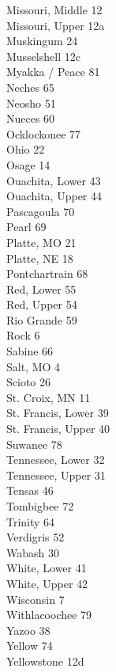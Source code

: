 \documentclass[11pt]{article}
\begin{document}
\begin{multicols}{3}
Missouri, Middle 12\\
Missouri, Upper 12a\\
Muskingum 24\\
Musselshell 12c\\
Myakka / Peace 81\\
Neches 65\\
Neosho 51\\
Nueces 60\\
Ocklockonee 77\\
Ohio 22\\
Osage 14\\
Ouachita, Lower 43\\
Ouachita, Upper 44\\
Pascagoula 70\\
Pearl 69\\
Platte, MO 21\\
Platte, NE 18\\
Pontchartrain 68\\
Red, Lower 55\\
Red, Upper 54\\
Rio Grande 59\\
Rock 6\\
Sabine 66\\
Salt, MO 4\\
Scioto 26\\
St. Croix, MN 11\\
St. Francis, Lower 39\\
St. Francis, Upper 40\\
Suwanee 78\\
Tennessee, Lower 32\\
Tennessee, Upper 31\\
Tensas 46\\
Tombigbee 72\\
Trinity 64\\
Verdigris 52\\
Wabash 30\\
White, Lower 41\\
White, Upper 42\\
Wisconsin 7\\
Withlacoochee 79\\
Yazoo 38\\
Yellow 74\\
Yellowstone 12d
\vspace{0.5\baselineskip}


\end{multicols}
\end{document}
